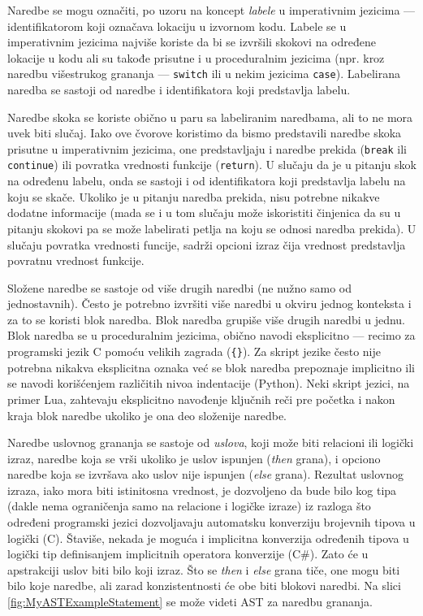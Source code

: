 Naredbe se mogu označiti, po uzoru na koncept \emph{labele} u imperativnim jezicima --- identifikatorom koji označava lokaciju u izvornom kodu. Labele se u imperativnim jezicima najviše koriste da bi se izvršili skokovi na određene lokacije u kodu ali su takođe prisutne i u proceduralnim jezicima (npr. kroz naredbu višestrukog grananja --- \texttt{switch} ili u nekim jezicima \texttt{case}). Labelirana naredba se sastoji od naredbe i identifikatora koji predstavlja labelu. 

Naredbe skoka se koriste obično u paru sa labeliranim naredbama, ali to ne mora uvek biti slučaj. Iako ove čvorove koristimo da bismo predstavili naredbe skoka prisutne u imperativnim jezicima, one predstavljaju i naredbe prekida (\texttt{break} ili \texttt{continue}) ili povratka vrednosti funkcije (\texttt{return}). U slučaju da je u pitanju skok na određenu labelu, onda se sastoji i od identifikatora koji predstavlja labelu na koju se skače. Ukoliko je u pitanju naredba prekida, nisu potrebne nikakve dodatne informacije (mada se i u tom slučaju može iskoristiti činjenica da su u pitanju skokovi pa se može labelirati petlja na koju se odnosi naredba prekida). U slučaju povratka vrednosti funcije, sadrži opcioni izraz čija vrednost predstavlja povratnu vrednost funkcije.

Složene naredbe se sastoje od više drugih naredbi (ne nužno samo od jednostavnih). Često je potrebno izvršiti više naredbi u okviru jednog konteksta i za to se koristi blok naredba. Blok naredba grupiše više drugih naredbi u jednu. Blok naredba se u proceduralnim jezicima, obično navodi eksplicitno --- recimo za programski jezik C pomoću velikih zagrada (\texttt{\{\}}). Za skript jezike često nije potrebna nikakva eksplicitna oznaka već se blok naredba prepoznaje implicitno ili se navodi korišćenjem različitih nivoa indentacije (Python). Neki skript jezici, na primer Lua, zahtevaju eksplicitno navođenje ključnih reči pre početka i nakon kraja blok naredbe ukoliko je ona deo složenije naredbe.

Naredbe uslovnog grananja se sastoje od \emph{uslova}, koji može biti relacioni ili logički izraz, naredbe koja se vrši ukoliko je uslov ispunjen (\emph{then} grana), i opciono naredbe koja se izvršava ako uslov nije ispunjen (\emph{else} grana). Rezultat uslovnog izraza, iako mora biti istinitosna vrednost, je dozvoljeno da bude bilo kog tipa (dakle nema ograničenja samo na relacione i logičke izraze) iz razloga što određeni programski jezici dozvoljavaju automatsku konverziju brojevnih tipova u logički (C). Štaviše, nekada je moguća i implicitna konverzija određenih tipova u logički tip definisanjem implicitnih operatora konverzije (C\#). Zato će u apstrakciji uslov biti bilo koji izraz. Što se \emph{then} i \emph{else} grana tiče, one mogu biti bilo koje naredbe, ali zarad konzistentnosti će obe biti blokovi naredbi. Na slici \ref{fig:MyASTExampleStatement} se može videti AST za naredbu grananja.

